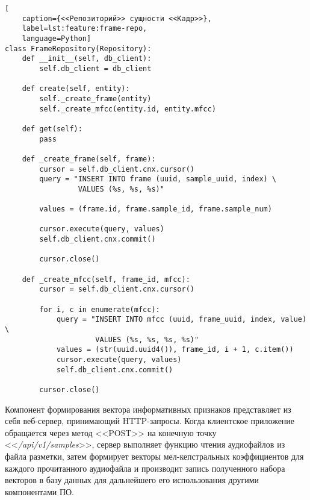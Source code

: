 \begin{lstlisting}[
	caption={<<Репозиторий>> сущности <<Кадр>>},
	label=lst:feature:frame-repo,
	language=Python]
class FrameRepository(Repository):
    def __init__(self, db_client):
        self.db_client = db_client

    def create(self, entity):
        self._create_frame(entity)
        self._create_mfcc(entity.id, entity.mfcc)

    def get(self):
        pass

    def _create_frame(self, frame):
        cursor = self.db_client.cnx.cursor()
        query = "INSERT INTO frame (uuid, sample_uuid, index) \
        		 VALUES (%s, %s, %s)"
        		 
        values = (frame.id, frame.sample_id, frame.sample_num)

        cursor.execute(query, values)
        self.db_client.cnx.commit()
        
        cursor.close()

    def _create_mfcc(self, frame_id, mfcc):
        cursor = self.db_client.cnx.cursor()

        for i, c in enumerate(mfcc):
            query = "INSERT INTO mfcc (uuid, frame_uuid, index, value) \
             		 VALUES (%s, %s, %s, %s)"
            values = (str(uuid.uuid4()), frame_id, i + 1, c.item())
            cursor.execute(query, values)
            self.db_client.cnx.commit()

        cursor.close()
\end{lstlisting}
Компонент формирования вектора информативных признаков представляет из себя веб-сервер, принимающий HTTP-запросы. Когда клиентское приложение обращается через метод <<POST>> на конечную точку <<\textit{/api/v1/samples}>>, сервер выполняет функцию чтения аудиофайлов из файла разметки, затем формирует векторы мел-кепстральных коэффициентов для каждого прочитанного аудиофайла и производит запись полученного набора векторов в базу данных для дальнейшего его использования другими компонентами ПО.

